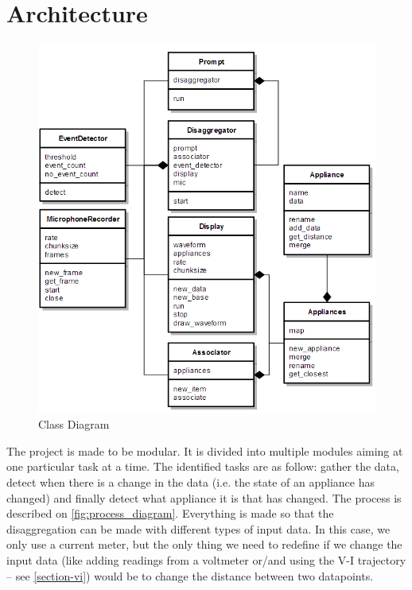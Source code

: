 \section{Architecture}
\begin{figure}
    \centering
    \includegraphics[width=\textwidth]{img/diagram.png}
    \caption{Class Diagram}
    \label{fig:class_diagram}
\end{figure}
The project is made to be modular. It is divided into multiple modules aiming at one particular task at a time. The identified tasks are as follow: gather the data, detect when there is a change in the data (i.e. the state of an appliance has changed) and finally detect what appliance it is that has changed. The process is described on \autoref{fig:process_diagram}. Everything is made so that the disaggregation can be made with different types of input data. In this case, we only use a current meter, but the only thing we need to redefine if we change the input data (like adding readings from a voltmeter or/and using the V-I trajectory -- see \autoref{section-vi}) would be to change the distance between two datapoints.


